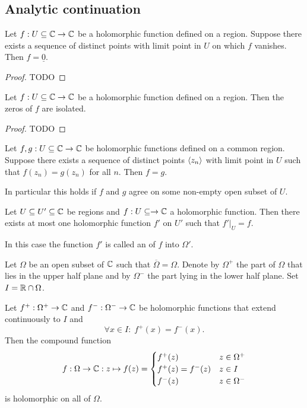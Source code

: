 \subsection{Analytic continuation}
\begin{proposition}
Let $f:U\subseteq \mathbb{C}\to \mathbb{C}$ be a holomorphic function defined on a region. Suppose there exists a sequence of distinct points with limit point in $U$ on which $f$ vanishes. Then $f = \underline{0}$.
\end{proposition}
\begin{proof}
TODO
\end{proof}
\begin{corollary} \label{zerosHolomorphicFunctionIsolated}
Let $f:U\subseteq \mathbb{C}\to \mathbb{C}$ be a holomorphic function defined on a region. Then the zeros of $f$ are isolated.
\end{corollary}
\begin{proof}
TODO
\end{proof}
\begin{corollary}
Let $f,g:U\subseteq \mathbb{C}\to \mathbb{C}$ be holomorphic functions defined on a common region. Suppose there exists a sequence of distinct points $\left\langle z_n \right\rangle$ with limit point in $U$ such that $f(z_n) = g(z_n)$ for all $n$. Then $f = g$.
\end{corollary}
In particular this holds if $f$ and $g$ agree on some non-empty open subset of $U$.
\begin{corollary}
Let $U\subseteq U' \subseteq \mathbb{C}$ be regions and $f:U\subseteq\to \mathbb{C}$ a holomorphic function. Then there exists at most one holomorphic function $f'$ on $U'$ such that $f'|_U = f$.
\end{corollary}

\begin{definition}
In this case the function $f'$ is called an  of $f$ into $\Omega'$.
\end{definition}

\begin{proposition} \label{symmetryPrinciple}
Let $\Omega$ be an open subset of $\mathbb{C}$ such that $\overline{\Omega} = \Omega$. Denote by $\Omega^+$ the part of $\Omega$ that lies in the upper half plane and by $\Omega^-$ the part lying in the lower half plane. Set $I = \mathbb{R} \cap \Omega$.

Let $f^+: \Omega^+ \to \mathbb{C}$ and $f^-: \Omega^- \to \mathbb{C}$ be holomorphic functions that extend continuously to $I$ and
\[ \forall x\in I: \; f^+(x) = f^-(x). \]
Then the compound function
\[ f: \Omega \to \mathbb{C}: z\mapsto f(z) = \begin{cases}
f^+(z) & z\in \Omega^+ \\
f^+(z) = f^-(z) & z\in I \\
f^-(z) & z\in \Omega^-
\end{cases} \]
is holomorphic on all of $\Omega$.
\end{proposition}

